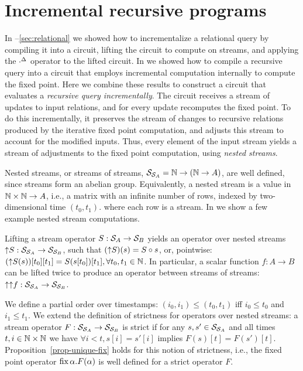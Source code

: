 \section{Incremental recursive programs}\label{sec:nested}

In --\ref{sec:relational} 
we showed how to incrementalize a relational query by
compiling it into a circuit, lifting the circuit to compute on streams, and
applying the ${\cdot}^{\Delta}$ operator to the lifted circuit.  In  we showed
how to compile a recursive query into a circuit that employs incremental
computation internally to compute the fixed point.
Here we combine these results to construct a circuit that evaluates a \emph{recursive
query incrementally}.  The circuit receives a stream of updates to input
relations, and for every update recomputes the fixed point.  To do this
incrementally, it preserves the stream of changes to recursive relations
produced by the iterative fixed point computation, and adjusts this stream to
account for the modified inputs.  Thus, every element of the input stream yields
a stream of adjustments to the fixed point computation, using
\emph{nested streams}.

Nested streams, or streams of streams, $\mathcal{S}_{\mathcal{S}_{A}} = \mathbb{N} \rightarrow (\mathbb{N}
\rightarrow A)$, are well defined, since streams form an abelian group.
Equivalently, a nested stream is a value in $\mathbb{N} \times \mathbb{N} \to A$, i.e., a matrix
with an infinite number of rows, indexed by two-dimensional time $(t_0, t_1)$. 
where each row is a stream.  In
 we show a few example nested stream
computations.

Lifting a stream operator $S: \mathcal{S}_{A} \to \mathcal{S}_{B}$ yields an operator over
nested streams ${\uparrow}S: \mathcal{S}_{\mathcal{S}_{A}} \to \mathcal{S}_{\mathcal{S}_{B}}$, such
that $({\uparrow}S)(s) = S \circ s$, or, pointwise: $({\uparrow}S(s))[t_0][t_1] =
S(s[t_0])[t_1], \forall t_0, t_1 \in \mathbb{N}$.  In particular, a scalar function $f:
A \rightarrow B$ can be lifted twice to produce an operator between streams of
streams: ${\uparrow}{\uparrow}f: \mathcal{S}_{\mathcal{S}_{A}} \rightarrow \mathcal{S}_{\mathcal{S}_{B}}$.

We define a partial order over timestamps: $(i_0, i_1)
\leq (t_0, t_1)$ iff $i_0 \leq t_0$ and $i_1 \leq t_1$.  We extend the
definition of strictness for operators over nested streams: a stream operator
$F: \mathcal{S}_{\mathcal{S}_{A}} \to \mathcal{S}_{\mathcal{S}_{B}}$ is strict if for any $s, s' \in
\mathcal{S}_{\mathcal{S}_{A}}$ and all times $t, i \in \mathbb{N} \times \mathbb{N}$ we have $\forall i <
t, s[i] = s'[i]$ implies $F(s)[t] = F(s')[t]$.
Proposition~\ref{prop-unique-fix} holds for this notion of strictness, i.e., the fixed point operator $\mbox{fix}\,\alpha.F(\alpha)$ is well defined for a strict operator $F$.

